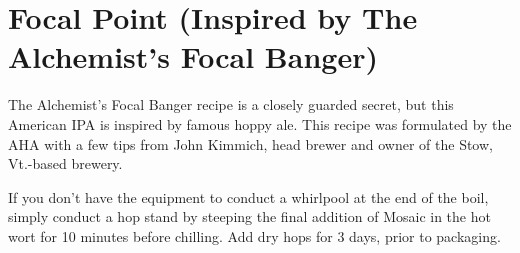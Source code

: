 \documentclass[10pt,oneside]{scrbook}
\begin{document}
\begin{ingredientsblock}

\begin{malts}
\end{malts}

\begin{hops}
\end{hops}

\begin{yeasts}
\end{yeasts}

\end{ingredientsblock}

\chapter*{Focal Point (Inspired by The Alchemist's Focal Banger)}

\begin{aboutblock}
The Alchemist's Focal Banger recipe is a closely guarded secret, but this American IPA is
inspired by famous hoppy ale. This recipe was formulated by the AHA with a few tips from
John Kimmich, head brewer and owner of the Stow, Vt.-based brewery.
\end{aboutblock}


\begin{methodandtiming}

\begin{mashsteps}
\end{mashsteps}

\begin{directions}
If you don't have the equipment to conduct a whirlpool at the end of the boil, simply conduct a
hop stand by steeping the final addition of Mosaic in the hot wort for 10 minutes before chilling.
Add dry hops for 3 days, prior to packaging. 
\end{directions}

\end{methodandtiming}
\end{document}
